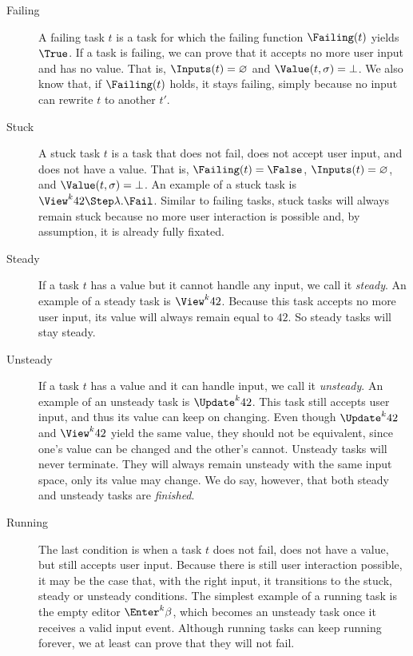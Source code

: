\begin{description}

  \item[Failing]
    A failing task $t$ is a task for which the failing function $\Failing(t)$ yields $\True$.
    If a task is failing, we can prove that it accepts no more user input and has no value.
    That is, $\Inputs(t) = \nothing$ and $\Value(t,\sigma) = \bot$.
    We also know that, if $\Failing(t)$ holds, it stays failing,
    simply because no input can rewrite $t$ to another $t'$.

  \item[Stuck]
    A stuck task $t$ is a task that does not fail, does not accept user input, and does not have a value.
    That is, $\Failing(t) = \False$, $\Inputs(t) = \nothing$, and $\Value(t,\sigma) = \bot$.
    An example of a stuck task is $\View^k 42 \Step \lambda. \Fail$.
    Similar to failing tasks, stuck tasks will always remain stuck because no more user interaction is possible and, by assumption, it is already fully fixated.

  \item[Steady]
    If a task $t$ has a value but it cannot handle any input, we call it \emph{steady}.
    An example of a steady task is $\View^k 42$.
    Because this task accepts no more user input, its value will always remain equal to $42$.
    So steady tasks will stay steady.

  \item[Unsteady]
    If a task $t$ has a value and it can handle input, we call it \emph{unsteady}.
    An example of an unsteady task is $\Update^k 42$.
    This task still accepts user input, and thus its value can keep on changing.
    Even though $\Update^k 42$ and $\View^k 42$ yield the same value,
    they should not be equivalent, since one's value can be changed and the other's cannot.
    Unsteady tasks will never terminate.
    They will always remain unsteady with the same input space, only its value may change.
    We do say, however, that both steady and unsteady tasks are \emph{finished}.

  \item[Running]
    The last condition is when a task $t$ does not fail, does not have a value, but still accepts user input.
    Because there is still user interaction possible, it may be the case that, with the right input,
    it transitions to the stuck, steady or unsteady conditions.
    The simplest example of a running task is the empty editor $\Enter^k \beta$,
    which becomes an unsteady task once it receives a valid input event.
    Although running tasks can keep running forever,
    we at least can prove that they will not fail.

\end{description}

